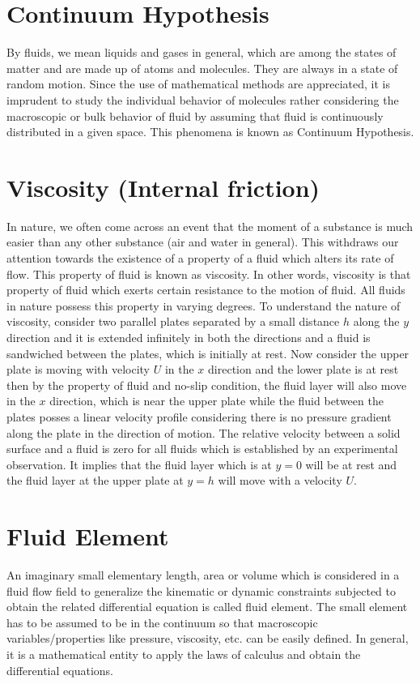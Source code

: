 \documentclass[14pt,one side, a4paper]{extbook}
\begin{document}
	\section{Continuum Hypothesis}
	By fluids, we mean liquids and gases in general, which are among the states of matter and are made up of atoms and molecules. They are always in a state of random motion. Since the use of mathematical methods are appreciated, it is imprudent to study the individual behavior of molecules rather considering  the macroscopic or bulk behavior of fluid by assuming that fluid is continuously distributed in a given space. This phenomena is known as Continuum Hypothesis\cite{gk10}.
	 \section{Viscosity (Internal friction)}
	 In nature, we often come across an event that the moment of a substance is much easier than any other substance (air and water in general). This withdraws our attention towards the existence of a property of a fluid which alters its rate of flow. This property of fluid is known as viscosity. In other words, viscosity is that property of fluid which exerts certain resistance to the motion of fluid. All fluids in nature possess this property in varying degrees. To understand the nature of viscosity, consider two parallel plates separated by a small distance $h$ along the $y$ direction and it is extended infinitely in both the directions and a fluid is sandwiched between the plates, which is initially at rest. Now consider the upper plate is moving with velocity $U$ in the $x$ direction and the lower plate is at rest then by the property of fluid and no-slip condition, the fluid layer will also move in the $x$ direction, which is near the upper plate while the fluid between the plates posses a linear velocity profile considering there is no pressure gradient along the plate in the direction of motion. The relative velocity between a solid surface and a fluid is zero for all fluids which is established by an experimental observation. It implies that the fluid layer which is at $y = 0$ will be at rest and the fluid layer at the upper plate at $y = h$ will move with a velocity $U$\cite{yuansw}.
	 \section{Fluid Element}
	 An imaginary small elementary length, area or volume which is considered in a fluid flow field to generalize the kinematic or dynamic constraints subjected to obtain the related differential equation is called fluid element. The small element has to be assumed to be in the continuum so that macroscopic variables/properties like pressure, viscosity, etc. can be easily defined. In general, it is a mathematical entity to apply the laws of calculus and obtain the differential equations\cite{landau}. 
\end{document}
